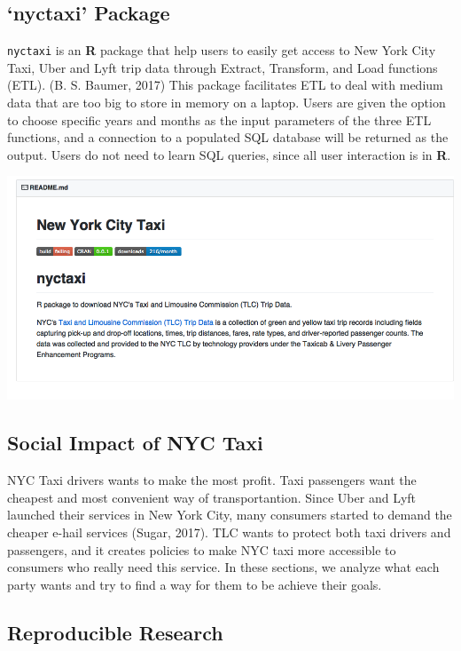 \documentclass[12pt,twoside]{reedthesis}
\theoremstyle{definition}
\theoremstyle{definition}
\theoremstyle{definition}
\theoremstyle{remark}
\begin{document}
\subsection{\texorpdfstring{`nyctaxi'
Package}{nyctaxi Package}}\label{nyctaxi-package}

\texttt{nyctaxi} is an \textbf{R} package that help users to easily get
access to New York City Taxi, Uber and Lyft trip data through Extract,
Transform, and Load functions (ETL). (B. S. Baumer, 2017) This package
facilitates ETL to deal with medium data that are too big to store in
memory on a laptop. Users are given the option to choose specific years
and months as the input parameters of the three ETL functions, and a
connection to a populated SQL database will be returned as the output.
Users do not need to learn SQL queries, since all user interaction is in
\textbf{R}.
\begin{center}\includegraphics[width=5.88in]{figure/nyctaxi-page} \end{center}

\subsection{Social Impact of NYC Taxi}\label{social-impact-of-nyc-taxi}

NYC Taxi drivers wants to make the most profit. Taxi passengers want the
cheapest and most convenient way of transportantion. Since Uber and Lyft
launched their services in New York City, many consumers started to
demand the cheaper e-hail services (Sugar, 2017). TLC wants to protect
both taxi drivers and passengers, and it creates policies to make NYC
taxi more accessible to consumers who really need this service. In these
sections, we analyze what each party wants and try to find a way for
them to be achieve their goals.

\subsection{Reproducible Research}\label{reproducible-research}
\end{document}
